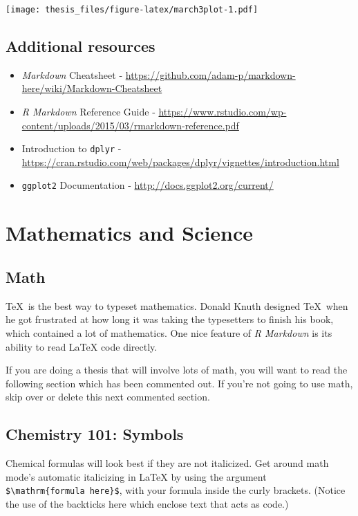 \documentclass[12pt,twoside]{reedthesis}
\theoremstyle{definition}
\theoremstyle{definition}
\theoremstyle{definition}
\theoremstyle{remark}
\begin{document}
\texttt{[image: thesis\_files/figure-latex/march3plot-1.pdf]}

\hypertarget{additional-resources}{%
\section{Additional resources}\label{additional-resources}}
\begin{itemize}
\item
  \emph{Markdown} Cheatsheet -
  \url{https://github.com/adam-p/markdown-here/wiki/Markdown-Cheatsheet}
\item
  \emph{R Markdown} Reference Guide -
  \url{https://www.rstudio.com/wp-content/uploads/2015/03/rmarkdown-reference.pdf}
\item
  Introduction to \texttt{dplyr} -
  \url{https://cran.rstudio.com/web/packages/dplyr/vignettes/introduction.html}
\item
  \texttt{ggplot2} Documentation -
  \url{http://docs.ggplot2.org/current/}
\end{itemize}
\hypertarget{math-sci}{%
\chapter{Mathematics and Science}\label{math-sci}}

\hypertarget{math}{%
\section{Math}\label{math}}

\TeX~is the best way to typeset mathematics. Donald Knuth designed
\TeX~when he got frustrated at how long it was taking the typesetters to
finish his book, which contained a lot of mathematics. One nice feature
of \emph{R Markdown} is its ability to read LaTeX code directly.

If you are doing a thesis that will involve lots of math, you will want
to read the following section which has been commented out. If you're
not going to use math, skip over or delete this next commented section.

\hypertarget{chemistry-101-symbols}{%
\section{Chemistry 101: Symbols}\label{chemistry-101-symbols}}

Chemical formulas will look best if they are not italicized. Get around
math mode's automatic italicizing in LaTeX by using the argument
\texttt{\$\textbackslash{}mathrm\{formula\ here\}\$}, with your formula
inside the curly brackets. (Notice the use of the backticks here which
enclose text that acts as code.)
\end{document}
